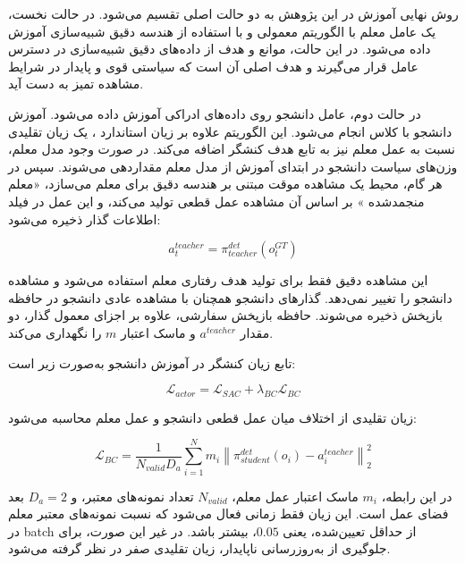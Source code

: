 روش نهایی آموزش در این پژوهش به دو حالت اصلی تقسیم می‌شود. در حالت نخست، یک عامل معلم با الگوریتم  معمولی و با استفاده از هندسه دقیق شبیه‌سازی آموزش داده می‌شود. در این حالت، موانع و هدف از داده‌های دقیق شبیه‌سازی در دسترس عامل قرار می‌گیرند و هدف اصلی آن است که سیاستی قوی و پایدار در شرایط مشاهده تمیز به دست آید.

در حالت دوم، عامل دانشجو روی داده‌های ادراکی آموزش داده می‌شود. آموزش دانشجو با کلاس  انجام می‌شود. این الگوریتم علاوه بر زیان استاندارد ، یک زیان تقلیدی نسبت به عمل معلم نیز به تابع هدف کنشگر اضافه می‌کند. در صورت وجود مدل معلم، وزن‌های سیاست دانشجو در ابتدای آموزش از مدل معلم مقداردهی می‌شوند. سپس در هر گام، محیط یک مشاهده موقت مبتنی بر هندسه دقیق برای معلم می‌سازد، «معلم منجمد‌شده%
» %
 بر اساس آن مشاهده عمل قطعی تولید می‌کند، و این عمل در فیلد اطلاعات گذار ذخیره می‌شود:

\begin{equation}
	a^{teacher}_t = \pi^{det}_{teacher}\left(o^{GT}_t\right)
	\label{eq:teacher_action_final}
\end{equation}

این مشاهده دقیق فقط برای تولید هدف رفتاری معلم استفاده می‌شود و مشاهده دانشجو را تغییر نمی‌دهد. گذارهای دانشجو همچنان با مشاهده عادی دانشجو در حافظه بازپخش ذخیره می‌شوند. حافظه بازپخش سفارشی، علاوه بر اجزای معمول گذار، دو مقدار \(a^{teacher}\) و ماسک اعتبار \(m\) را نگهداری می‌کند.

تابع زیان کنشگر در آموزش دانشجو به‌صورت زیر است:

\begin{equation}
	\mathcal{L}_{actor}=
	\mathcal{L}_{SAC}+\lambda_{BC}\mathcal{L}_{BC}
	\label{eq:distilled_actor_loss_final}
\end{equation}

زیان تقلیدی از اختلاف میان عمل قطعی دانشجو و عمل معلم محاسبه می‌شود:

\begin{equation}
	\mathcal{L}_{BC}=
	\frac{1}{N_{valid}D_a}
	\sum_{i=1}^{N}
	m_i
	\left\|
	\pi^{det}_{student}(o_i)-a^{teacher}_i
	\right\|_2^2
	\label{eq:bc_loss_final}
\end{equation}

در این رابطه، \(m_i\) ماسک اعتبار عمل معلم، \(N_{valid}\) تعداد نمونه‌های معتبر، و \(D_a=2\) بعد فضای عمل است. این زیان فقط زمانی فعال می‌شود که نسبت نمونه‌های معتبر معلم در batch از حداقل تعیین‌شده، یعنی \(0.05\)، بیشتر باشد. در غیر این صورت، برای جلوگیری از به‌روزرسانی ناپایدار، زیان تقلیدی صفر در نظر گرفته می‌شود.


